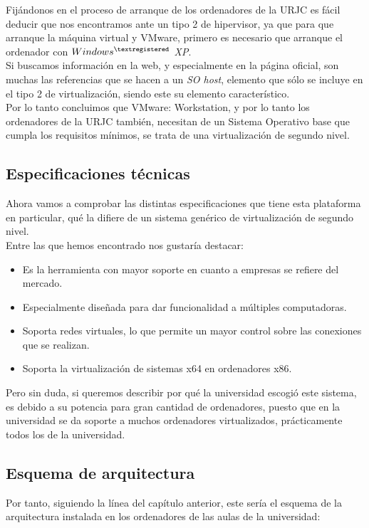 Fijándonos en el proceso de arranque de los ordenadores de la URJC es fácil deducir que nos encontramos ante un tipo 2 de hipervisor, ya que para que arranque la máquina virtual y VMware, primero es necesario que arranque el ordenador con \emph{$Windows^{\textregistered}$ XP}.\\

Si buscamos información en la web\cite{refvmware1}, y especialmente en la página oficial\cite{vmwareworkguiaso}\cite{refvmware2}, son muchas las referencias que se hacen a un \emph{SO host}, elemento que sólo se incluye en el tipo 2 de virtualización, siendo este su elemento característico.\\

Por lo tanto concluimos que VMware: Workstation, y por lo tanto los ordenadores de la URJC también, necesitan de un Sistema Operativo base que cumpla los requisitos mínimos, se trata de una virtualización de segundo nivel.

\subsection{Especificaciones técnicas}
Ahora vamos a comprobar las distintas especificaciones que tiene esta plataforma en particular, qué la difiere de un sistema genérico de virtualización de segundo nivel.\\

Entre las que hemos encontrado nos gustaría destacar:

\begin{itemize}
\item Es la herramienta con mayor soporte en cuanto a empresas se refiere del mercado.
\item Especialmente diseñada para dar funcionalidad a múltiples computadoras.
\item Soporta redes virtuales, lo que permite un mayor control sobre las conexiones que se realizan.
\item Soporta la virtualización de sistemas x64 en ordenadores x86.
\end{itemize}

Pero sin duda, si queremos describir por qué la universidad escogió este sistema, es debido a su potencia para gran cantidad de ordenadores, puesto que en la universidad se da soporte a muchos ordenadores virtualizados, prácticamente todos los de la universidad.

\subsection{Esquema de arquitectura}
Por tanto, siguiendo la línea del capítulo anterior, este sería el esquema de la arquitectura instalada en los ordenadores de las aulas de la universidad:

